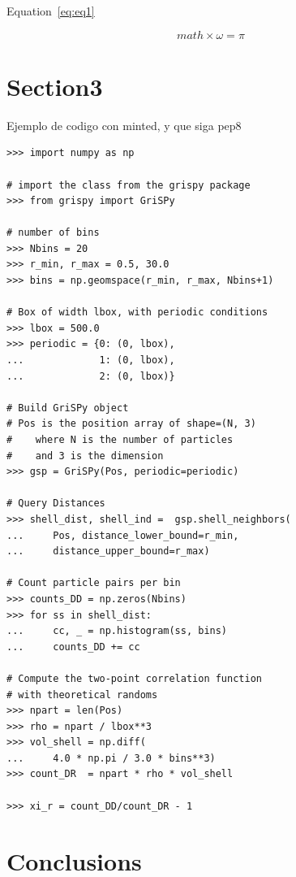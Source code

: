 \documentclass[final,5p,times,twocolumn]{elsarticle}
\begin{document}
Equation~\ref{eq:eq1}

\begin{equation}
    math \times \omega = \pi
\label{eq:eq1}
\end{equation}


\section{Section3}

Ejemplo de codigo con minted, y que siga pep8
\begin{verbatim}
>>> import numpy as np

# import the class from the grispy package
>>> from grispy import GriSPy

# number of bins
>>> Nbins = 20  
>>> r_min, r_max = 0.5, 30.0 
>>> bins = np.geomspace(r_min, r_max, Nbins+1) 

# Box of width lbox, with periodic conditions
>>> lbox = 500.0
>>> periodic = {0: (0, lbox), 
...             1: (0, lbox),
...             2: (0, lbox)}

# Build GriSPy object
# Pos is the position array of shape=(N, 3)
#    where N is the number of particles
#    and 3 is the dimension
>>> gsp = GriSPy(Pos, periodic=periodic)

# Query Distances
>>> shell_dist, shell_ind =  gsp.shell_neighbors(
...     Pos, distance_lower_bound=r_min,
...     distance_upper_bound=r_max)

# Count particle pairs per bin
>>> counts_DD = np.zeros(Nbins)
>>> for ss in shell_dist:
...     cc, _ = np.histogram(ss, bins)
...     counts_DD += cc

# Compute the two-point correlation function
# with theoretical randoms
>>> npart = len(Pos)
>>> rho = npart / lbox**3
>>> vol_shell = np.diff(
...     4.0 * np.pi / 3.0 * bins**3)
>>> count_DR  = npart * rho * vol_shell

>>> xi_r = count_DD/count_DR - 1
\end{verbatim}


\section{Conclusions}

\end{document}

